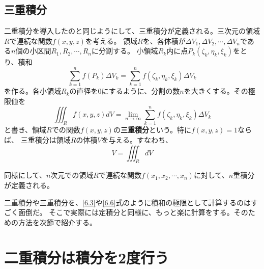 \documentclass[a4j,dvipdfmx]{jsarticle}
\begin{document}
\subsection{三重積分}
二重積分を導入したのと同じようにして、三重積分が定義される。三次元の領域$R$で連続な関数$f(x,y,z)$を考える。
領域$R$を、各体積が$\Delta V_1,\Delta V_2,\cdots,\Delta V_n$である$n$個の小区間$R_1,R_2,\cdots,R_n$に分割する。
小領域$R_k$内に点$P_k(\zeta_k,\eta_k,\xi_k)$をとり、積和
\begin{equation}
    \sum_{k=1}^{n}f(P_k)\Delta V_k=\sum_{k=1}^{n}f(\zeta_k,\eta_k,\xi_k)\Delta V_k\label{6.5}
\end{equation}
を作る。各小領域$R_k$の直径を0にするように、分割の数$n$を大きくする。その極限値を
\begin{equation}
    \iiint_R f(x,y,z)dV=\lim_{n\to\infty}\sum_{k=1}^{n}f(\zeta_k,\eta_k,\xi_k)\Delta V_k\label{6.6}
\end{equation}
と書き、領域$R$での関数$f(x,y,z)$の\textbf{三重積分}という。特に$f(x,y,z)=1$ならば、
三重積分は領域$R$の体積$V$を与える。すなわち、
\begin{equation}
    V=\iiint_R dV\label{6.7}
\end{equation}

同様にして、$n$次元での領域$R$で連続な関数$f(x_1,x_2,\cdots,x_n)$に対して、$n$重積分が定義される。

二重積分や三重積分を、\eqref{6.3}や\eqref{6.6}式のように積和の極限として計算するのはすごく面倒だ。
そこで実際には定積分と同様に、もっと楽に計算をする。そのための方法を次節で紹介する。

\section{二重積分は積分を2度行う}
\end{document}
